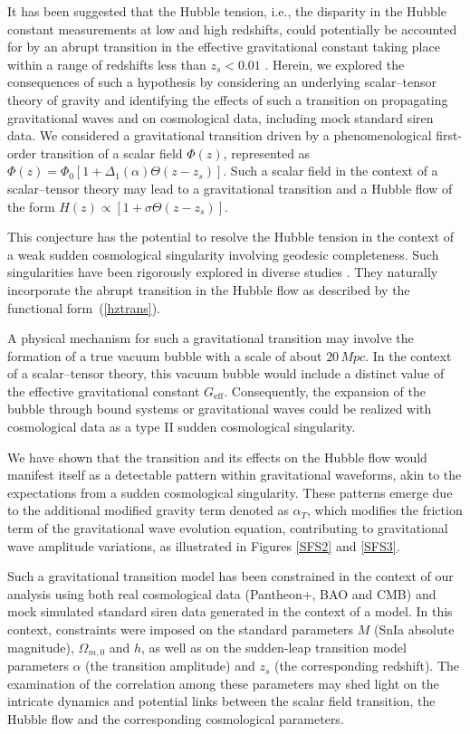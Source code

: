\documentclass[universe,article,accept,moreauthors,pdftex]{Definitions/mdpi}
\begin{document}
It has been suggested that the Hubble tension, i.e., the disparity in the Hubble constant measurements at low and high redshifts, could potentially be accounted for by an abrupt transition in the effective gravitational constant taking place within a range of redshifts less than $z_s< 0.01$ \cite{Marra:2021fvf}. Herein, we explored the consequences of such a hypothesis by considering an underlying scalar--tensor theory of gravity and identifying the effects of such a transition on propagating gravitational waves and on cosmological data, including mock standard siren data. We considered a gravitational transition driven by a phenomenological first-order transition of a scalar field $\Phi(z)$, represented as $\Phi(z)=\Phi_{0}[1+\Delta_{1}(\alpha) \Theta(z-z_{s})]$. Such a scalar field in the context of a scalar--tensor theory may lead to a gravitational transition and a Hubble flow of the form $H(z)\propto [1+\sigma \Theta(z-z_s)]$.

This conjecture has the potential to resolve the Hubble tension \cite{Abdalla:2022yfr,Marra:2021fvf,Alestas:2022xxm,Kazantzidis:2020tko} in the context of a weak sudden cosmological singularity involving geodesic completeness. Such singularities have been rigorously explored in diverse studies \cite{Fernandez-Jambrina:2006tkb,Fern_ndez_Jambrina_2021,Perivolaropoulos:2016nhp,Barrow_2004}. They naturally incorporate the abrupt transition in the Hubble flow as described by the functional \mbox{form (\ref{hztrans}).}

A physical mechanism for such a gravitational transition may involve the formation of a true vacuum bubble with a scale of about $20\, Mpc$. In the context of a scalar--tensor theory, this vacuum bubble would include a distinct value of the effective gravitational constant $G_{\text{eff}}$. Consequently, the expansion of the bubble through bound systems or gravitational waves could be realized with cosmological data as a type II sudden cosmological singularity. 

We have shown that the transition and its effects on the Hubble flow would manifest itself as a detectable pattern within gravitational waveforms, akin to the expectations from a sudden cosmological singularity. These patterns emerge due to the additional modified gravity term
denoted as $\alpha_T$, which modifies the friction term of the gravitational wave evolution equation, contributing to gravitational wave amplitude variations, as illustrated in Figures \ref{SFS2} and \ref{SFS3}.

Such a gravitational transition model has been constrained in the context of our analysis using both real cosmological data (Pantheon+, BAO and CMB) and mock simulated standard siren data generated in the context of a \plcdm model. 
In this context, constraints were imposed on the  standard parameters $M$ (SnIa absolute magnitude), $\Omega_{m,0}$ and $h$, as well as on the sudden-leap transition model parameters $\alpha$ (the transition amplitude) and $z_{s}$ (the corresponding redshift). The examination of the correlation among these parameters may shed light on the intricate dynamics and potential links between the scalar field transition, the Hubble flow and the corresponding cosmological parameters.
\end{document}

